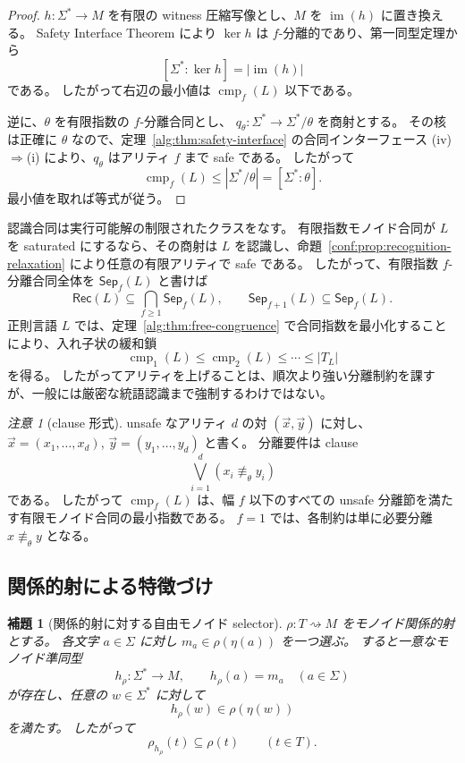 \documentclass[10pt,a4paper]{ltjsarticle}
\newtheorem{lemma}[theorem]{補題}
\theoremstyle{definition}
\theoremstyle{remark}
\newtheorem{remark}[theorem]{注意}
\newcommand{\cmp}{\operatorname{cmp}}
\newcommand{\relto}{\mathrel{\rightsquigarrow}}
\begin{document}
\begin{proof}
$h:\Sigma^*\to M$ を有限の witness 圧縮写像とし、$M$ を $\operatorname{im}(h)$ に置き換える。
Safety Interface Theorem により $\ker h$ は $f$-分離的であり、第一同型定理から
\[
[\Sigma^*:\ker h]=|\operatorname{im}(h)|
\]
である。
したがって右辺の最小値は $\cmp_f(L)$ 以下である。

逆に、$\theta$ を有限指数の $f$-分離合同とし、
$q_\theta:\Sigma^*\to\Sigma^*/\theta$
を商射とする。
その核は正確に $\theta$ なので、定理~\ref{alg:thm:safety-interface} の合同インターフェース
\textup{(iv)}$\Rightarrow$\textup{(i)}
により、$q_\theta$ はアリティ $f$ まで safe である。
したがって
\[
\cmp_f(L)
\le |\Sigma^*/\theta|
=[\Sigma^*:\theta].
\]
最小値を取れば等式が従う。
\end{proof}

認識合同は実行可能解の制限されたクラスをなす。
有限指数モノイド合同が $L$ を saturated にするなら、その商射は $L$ を認識し、命題~\ref{conf:prop:recognition-relaxation} により任意の有限アリティで safe である。
したがって、有限指数 $f$-分離合同全体を $\mathsf{Sep}_f(L)$ と書けば
\[
\mathsf{Rec}(L)
\subseteq
\bigcap_{f\ge1}\mathsf{Sep}_f(L),
\qquad
\mathsf{Sep}_{f+1}(L)\subseteq\mathsf{Sep}_f(L).
\]
正則言語 $L$ では、定理~\ref{alg:thm:free-congruence} で合同指数を最小化することにより、入れ子状の緩和鎖
\[
\cmp_1(L)\le\cmp_2(L)\le\cdots\le |T_L|
\]
を得る。
したがってアリティを上げることは、順次より強い分離制約を課すが、一般には厳密な統語認識まで強制するわけではない。

\begin{remark}[clause 形式]
unsafe なアリティ $d$ の対 $(\vec x,\vec y)$ に対し、
$\vec x=(x_1,\ldots,x_d)$, $\vec y=(y_1,\ldots,y_d)$ と書く。
分離要件は clause
\[
\bigvee_{i=1}^d(x_i\not\equiv_\theta y_i)
\]
である。
したがって $\cmp_f(L)$ は、幅 $f$ 以下のすべての unsafe 分離節を満たす有限モノイド合同の最小指数である。
$f=1$ では、各制約は単に必要分離
$x\not\equiv_\theta y$
となる。
\end{remark}

\subsection{関係的射による特徴づけ}

\begin{lemma}[関係的射に対する自由モノイド selector]
\label{alg:lem:selector}
$\rho:T\relto M$ をモノイド関係的射とする。
各文字 $a\in\Sigma$ に対し
$m_a\in\rho(\eta(a))$
を一つ選ぶ。
すると一意なモノイド準同型
\[
h_\rho:\Sigma^*\to M,
\qquad
h_\rho(a)=m_a\quad(a\in\Sigma)
\]
が存在し、任意の $w\in\Sigma^*$ に対して
\[
h_\rho(w)\in\rho(\eta(w))
\]
を満たす。
したがって
\[
\rho_{h_\rho}(t)\subseteq\rho(t)
\qquad(t\in T).
\]
\end{lemma}
\end{document}
